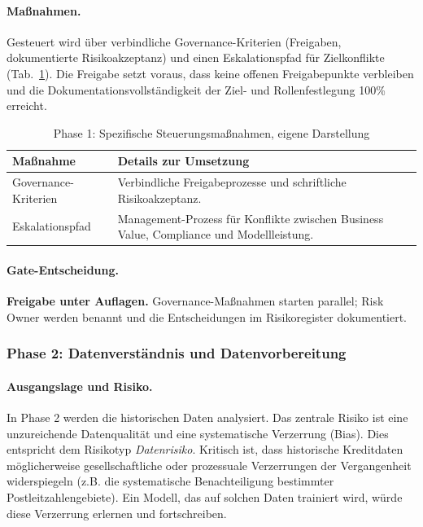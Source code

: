 \paragraph*{Maßnahmen.}
Gesteuert wird über verbindliche Governance-Kriterien (Freigaben, dokumentierte
Risikoakzeptanz) und einen Eskalationspfad für Zielkonflikte (Tab.~\ref{tab:cs1_phase1_massnahmen}).
Die Freigabe setzt voraus, dass keine offenen Freigabepunkte verbleiben und die Dokumentationsvollständigkeit der Ziel- und Rollenfestlegung 100\% erreicht.

\begin{table}[!htbp]
\centering
\begin{tabular}{|p{4cm}|p{8cm}|}
\hline
\textbf{Maßnahme} & \textbf{Details zur Umsetzung} \\
\hline
Governance-Kriterien & Verbindliche Freigabeprozesse und schriftliche Risikoakzeptanz. \\
Eskalationspfad & Management-Prozess für Konflikte zwischen Business Value, Compliance und Modellleistung. \\
\hline
\end{tabular}
\caption{Phase 1: Spezifische Steuerungsmaßnahmen, eigene Darstellung}
\label{tab:cs1_phase1_massnahmen}
\end{table}

\paragraph*{Gate-Entscheidung.}
\textbf{Freigabe unter Auflagen.} Governance-Maßnahmen starten parallel; Risk Owner werden benannt
und die Entscheidungen im Risikoregister dokumentiert.

\subsubsection{Phase 2: Datenverständnis und Datenvorbereitung}
\paragraph*{Ausgangslage und Risiko.}
In Phase 2 werden die historischen Daten analysiert.
Das zentrale Risiko ist eine unzureichende Datenqualität
und eine systematische Verzerrung (Bias).
Dies entspricht dem Risikotyp \textit{Datenrisiko}.
Kritisch ist, dass historische Kreditdaten möglicherweise gesellschaftliche
oder prozessuale Verzerrungen der Vergangenheit widerspiegeln
(z.B. die systematische Benachteiligung bestimmter Postleitzahlengebiete).
Ein Modell, das auf solchen Daten trainiert wird,
würde diese Verzerrung erlernen und fortschreiben.

